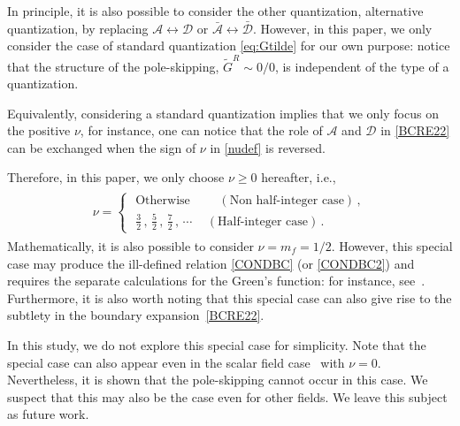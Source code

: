 \documentclass[11pt,a4paper]{article}
\newcommand\cw[1]{\textcolor{red}{#1}}
\begin{document}
In principle, it is also possible to consider the other quantization, alternative quantization, by replacing $\mathcal{A} \leftrightarrow \mathcal{D}$ or $\bar{\mathcal{A}}\leftrightarrow \bar{\mathcal{D}}$.
However, in this paper, we only consider the case of standard quantization \eqref{eq:Gtilde} for our own purpose: notice that the structure of the pole-skipping, $\tilde{G}^{R}\sim 0/0$, is independent of the type of a quantization.

Equivalently, considering a standard quantization implies that we only focus on the positive $\nu$, for instance, one can notice that the role of $\mathcal{A}$ and $\mathcal{D}$ in
\eqref{BCRE22} can be exchanged when the sign of $\nu$ in \eqref{nudef} is reversed.

Therefore, in this paper, we only choose $\nu \geq 0$ hereafter, i.e.,
\begin{align}\label{nurange2}
\begin{split}
\nu = 
\begin{cases}
       \,\, \textrm{Otherwise} \qquad\,\, (\textrm{Non half-integer case}) \,, \\
       \,\, \frac{3}{2}\,,\, \frac{5}{2} \,,\, \frac{7}{2} \,,\, \cdots\, \quad (\textrm{Half-integer case}) \,.
\end{cases}
\end{split}
\end{align}
Mathematically, it is also possible to consider $\nu=m_f=1/2$. However, this special case may produce the ill-defined relation \eqref{CONDBC} (or \eqref{CONDBC2}) and requires the separate calculations for the Green's function: for instance, see~\cite{Iqbal:2009fd}.
Furthermore, it is also worth noting that this special case can also give rise to the subtlety in the boundary expansion~\eqref{BCRE22}.

In this study, we do not explore this special case for simplicity. Note that the special case can also appear even in the scalar field case~\cite{Natsuume:2020snz} with $\nu=0$. Nevertheless, it is shown \cite{Natsuume:2020snz} that the pole-skipping cannot occur in this case. We suspect that this may also be the case even for other fields. We leave this subject as future work.\\

 
\end{document}
